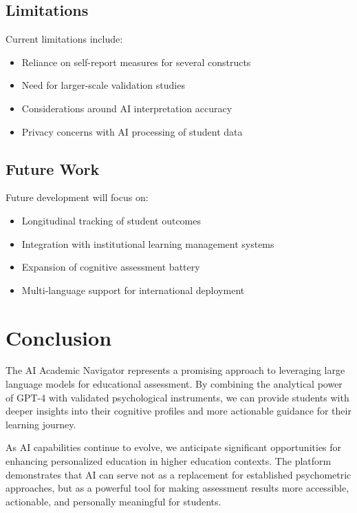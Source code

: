 \documentclass[11pt,a4paper]{article}
\begin{document}
\subsection{Limitations}

Current limitations include:
\begin{itemize}[noitemsep]
    \item Reliance on self-report measures for several constructs
    \item Need for larger-scale validation studies
    \item Considerations around AI interpretation accuracy
    \item Privacy concerns with AI processing of student data
\end{itemize}

\subsection{Future Work}

Future development will focus on:
\begin{itemize}[noitemsep]
    \item Longitudinal tracking of student outcomes
    \item Integration with institutional learning management systems
    \item Expansion of cognitive assessment battery
    \item Multi-language support for international deployment
\end{itemize}

\section{Conclusion}

The AI Academic Navigator represents a promising approach to leveraging large language models for educational assessment. By combining the analytical power of GPT-4 with validated psychological instruments, we can provide students with deeper insights into their cognitive profiles and more actionable guidance for their learning journey.

As AI capabilities continue to evolve, we anticipate significant opportunities for enhancing personalized education in higher education contexts. The platform demonstrates that AI can serve not as a replacement for established psychometric approaches, but as a powerful tool for making assessment results more accessible, actionable, and personally meaningful for students.
\end{document}

